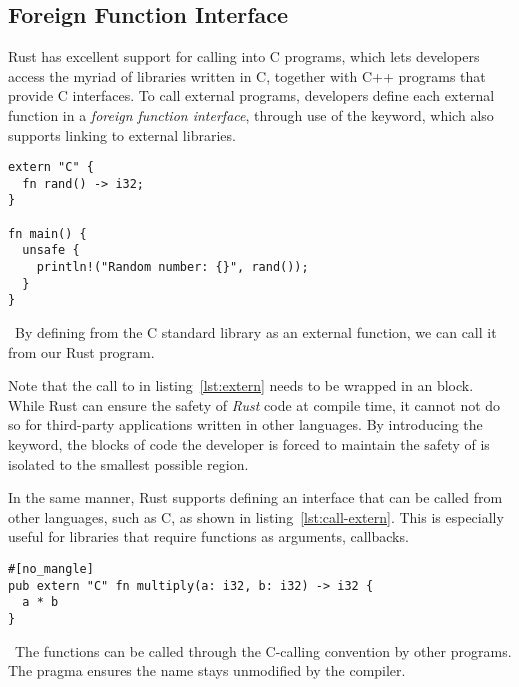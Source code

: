 \subsection{Foreign Function Interface}\label{sec:ffi}

Rust has excellent support for calling into C programs, which lets developers
access the myriad of libraries written in C, together with C++ programs that
provide C interfaces. To call external programs, developers define each external
function in a \textit{foreign function
interface}, through
use of the  keyword, which also supports linking to external
libraries.

\begin{listing}[H]
  \begin{verbatim}
extern "C" {
  fn rand() -> i32;
}

fn main() {
  unsafe {
    println!("Random number: {}", rand());
  }
}
  \end{verbatim}
  \caption{\
    By defining  from the C standard library as an external function,
    we can call it from our Rust program.
  }\label{lst:extern}
\end{listing}

Note that the call to  in listing~\ref{lst:extern} needs
to be wrapped in an \code{unsafe} block. While Rust can ensure the safety of
\textit{Rust} code at compile time, it cannot not do so for third-party
applications written in other languages. By introducing the 
keyword, the blocks of code the developer is forced to maintain the safety of is
isolated to the smallest possible region.

In the same manner, Rust supports defining an interface that can be called from
other languages, such as C, as shown in listing~\ref{lst:call-extern}. This is
especially useful for libraries that require functions as arguments, \eg callbacks.

\begin{listing}[H]
  \begin{verbatim}
#[no_mangle]
pub extern "C" fn multiply(a: i32, b: i32) -> i32 {
  a * b
}
  \end{verbatim}
  \caption{\
    The  functions can be called through the C-calling convention
    by other programs. The  pragma ensures the 
    name stays unmodified by the compiler.
  }\label{lst:call-extern}
\end{listing}

